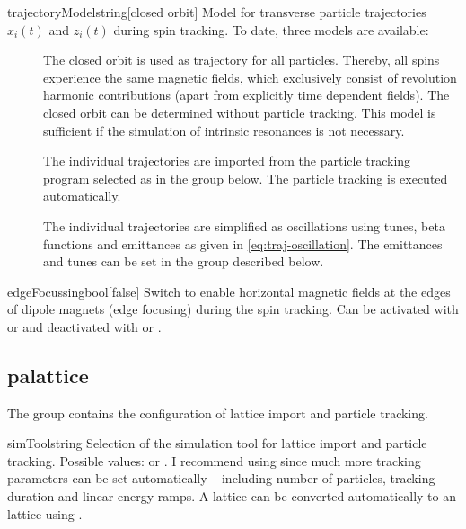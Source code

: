 \documentclass[a4paper]{scrartcl}
\begin{document}
\begin{configdoc}{trajectoryModel}{string}{}[closed orbit]
  Model for transverse particle trajectories $x_i(t)$ and
  $z_i(t)$ during spin tracking. To date, three models are available:
  \begin{description}
  \item[] The closed orbit is used as trajectory for all
    particles. Thereby, all spins experience the same magnetic fields, which exclusively
    consist of revolution harmonic contributions (apart from explicitly time dependent
    fields). The closed orbit can be determined without particle tracking. This model is
    sufficient if the simulation of intrinsic resonances is not necessary.
  \item[] The individual trajectories are imported from the particle
    tracking program selected as  in the group
     below. The particle tracking is executed automatically.
  \item[] The individual trajectories are simplified as
    oscillations using tunes, beta functions and emittances as given in
    \cref{eq:traj-oscillation}. The emittances and tunes can be set in the group
     described below.
  \end{description}
\end{configdoc}

\begin{configdoc}{edgeFocussing}{bool}{}[false]
  Switch to enable horizontal magnetic fields at the edges of dipole magnets (edge
  focusing) during the spin tracking. Can be activated with  or
   and deactivated with  or .
\end{configdoc}




\subsection{palattice}
\label{sec:config-pal}
The group  contains the configuration of lattice import and
particle tracking.\\[2mm]

\begin{configdoc}{simTool}{string}{}
  Selection of the simulation tool for lattice import and particle tracking. Possible values:
   or . I recommend using \ele since much more tracking
  parameters can be set automatically -- including number of particles, tracking duration
  and linear energy ramps. A \madx lattice can be converted automatically to an \ele
  lattice using \pal.
\end{configdoc}
\end{document}
